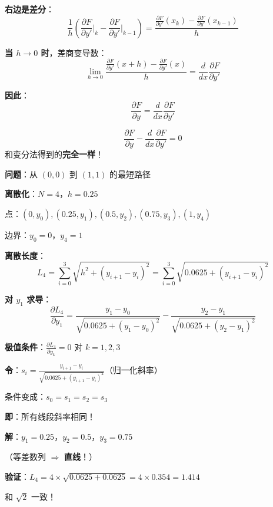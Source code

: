 \documentclass[12pt, a4paper]{ctexart}
\begin{document}
\begin{blackboard}[取连续极限]

\textbf{右边是差分}：
\[
\frac{1}{h}\left( \frac{\partial F}{\partial y'}\bigg|_k - \frac{\partial F}{\partial y'}\bigg|_{k-1} \right) = \frac{\frac{\partial F}{\partial y'}(x_k) - \frac{\partial F}{\partial y'}(x_{k-1})}{h}
\]

\textbf{当 $h \to 0$ 时}，差商变导数：
\[
\lim_{h \to 0} \frac{\frac{\partial F}{\partial y'}(x + h) - \frac{\partial F}{\partial y'}(x)}{h} = \frac{d}{dx}\frac{\partial F}{\partial y'}
\]

\textbf{因此}：
\[
\frac{\partial F}{\partial y} = \frac{d}{dx}\frac{\partial F}{\partial y'}
\]

\begin{keypoint}
\[
\boxed{\frac{\partial F}{\partial y} - \frac{d}{dx}\frac{\partial F}{\partial y'} = 0}
\]
和变分法得到的\textbf{完全一样}！
\end{keypoint}

\end{blackboard}

\begin{blackboard}

\textbf{问题}：从 $(0, 0)$ 到 $(1, 1)$ 的最短路径

\textbf{离散化}：$N = 4$，$h = 0.25$

点：$(0, y_0), (0.25, y_1), (0.5, y_2), (0.75, y_3), (1, y_4)$

边界：$y_0 = 0$，$y_4 = 1$

\textbf{离散长度}：
\[
L_4 = \sum_{i=0}^{3} \sqrt{h^2 + (y_{i+1} - y_i)^2} = \sum_{i=0}^{3} \sqrt{0.0625 + (y_{i+1} - y_i)^2}
\]

\textbf{对 $y_1$ 求导}：
\[
\frac{\partial L_4}{\partial y_1} = \frac{y_1 - y_0}{\sqrt{0.0625 + (y_1 - y_0)^2}} - \frac{y_2 - y_1}{\sqrt{0.0625 + (y_2 - y_1)^2}}
\]

\end{blackboard}

\begin{blackboard}[数值例子（续）]

\textbf{极值条件}：$\frac{\partial L_4}{\partial y_k} = 0$ 对 $k = 1, 2, 3$

\textbf{令}：$s_i = \frac{y_{i+1} - y_i}{\sqrt{0.0625 + (y_{i+1} - y_i)^2}}$（归一化斜率）

条件变成：$s_0 = s_1 = s_2 = s_3$

\textbf{即}：所有线段斜率相同！

\textbf{解}：$y_1 = 0.25$，$y_2 = 0.5$，$y_3 = 0.75$

（等差数列 $\Rightarrow$ \textbf{直线}！）

\textbf{验证}：$L_4 = 4 \times \sqrt{0.0625 + 0.0625} = 4 \times 0.354 = \mathbf{1.414}$

和 $\sqrt{2}$ 一致！

\end{blackboard}
\end{document}
